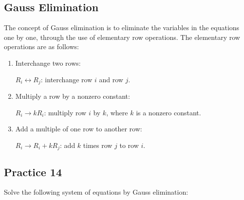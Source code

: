 \documentclass{report}
\begin{document}
\begin{multicols}{2}
  \section{Gauss Elimination}

  The concept of Gauss elimination is to eliminate the variables in the equations
  one by one, through the use of elementary row operations. The elementary row
  operations are as follows:

  \begin{enumerate}
    \item Interchange two rows:

          $R_i \leftrightarrow R_j$: interchange row $i$ and row
          $j$.
    \item Multiply a row by a nonzero constant:

          $R_i \rightarrow kR_i$: multiply row $i$
          by $k$, where $k$ is a nonzero constant.
    \item Add a multiple of one row to another row:

          $R_i \rightarrow R_i + kR_j$: add $k$ times row
          $j$ to row $i$.
  \end{enumerate}

  \subsection{Practice 14}

  Solve the following system of equations by Gauss elimination:


\end{multicols}
\end{document}
